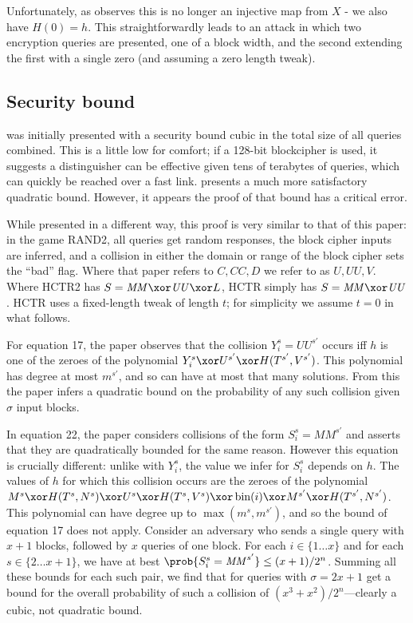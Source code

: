 \documentclass[letterpaper,11pt]{article}
\newcommand*{\MM}{\mathit{MM}}
\newcommand*{\UU}{\mathit{UU}}
\DeclareMathOperator{\fromint}{bin}
\begin{document}
Unfortunately, as \cite{kumarhctr} observes this is no longer
an injective map from \(X\) - we also have \(H(0) = h\). This
straightforwardly leads to an attack in which two encryption queries
are presented, one of a block width, and the second extending
the first with a single zero (and assuming a zero length tweak).

\subsection{Security bound}
\cite{hctr} was initially presented with a security bound cubic
in the total size of all queries combined.  This is a little low
for comfort; if a 128-bit blockcipher is used, it suggests a
distinguisher can be effective given tens of terabytes of queries,
which can quickly be reached over a fast link. 
\cite{hctrquad} presents a much more satisfactory quadratic bound.
However, it appears the proof of that bound has a critical error.

While presented in a different way, this proof is very similar
to that of this paper: in the game RAND2, all queries get random
responses, the block cipher inputs are inferred, and a collision
in either the domain or range of the block cipher
sets the ``bad'' flag. Where that paper refers to 
\(C, \mathit{CC}, D\)
we refer to as \(U, \UU, V\). Where HCTR2 has
\(S = \MM \xor \UU \xor L\), HCTR simply has
\(S = \MM \xor \UU\). HCTR uses a fixed-length tweak
of length \(t\); for simplicity we assume \(t = 0\)
in what follows.

For equation 17, the paper observes that the collision
\(Y_i^s = \UU^{s'}\) occurs iff \(h\) is one of the zeroes
of the polynomial \(Y_i^s \xor U^{s'} \xor H(T^{s'}, V^{s'})\).
This polynomial has degree at most
\(m^{s'}\), and so can have
at most that many solutions. From this the paper infers
a quadratic bound on the probability of any such collision
given \(\sigma\) input blocks.

In equation 22, the paper considers collisions of the form 
\(S_i^s = \MM^{s'}\) and asserts that they are
quadratically bounded for the same reason. However this equation
is crucially different: unlike with \(Y_i^s\), the value we
infer for \(S_i^s\) depends on \(h\). The values of \(h\)
for which this collision occurs are
the zeroes of the polynomial
\(M^s \xor H(T^s, N^s)
\xor U^s \xor H(T^s, V^s) \xor \fromint(i) 
\xor M^{s'} \xor H(T^{s'}, N^{s'})\).
This polynomial can have degree up to 
\(\max(m^s, m^{s'})\), and so the bound of
equation 17 does not apply.
Consider an adversary who
sends a single query with \(x+1\) blocks, followed by
\(x\) queries of one block. For each \(i \in \{1\ldots x\}\) and
for each \(s \in \{2 \ldots x + 1\}\), we have at best
\(\prob{S_i^s = \MM^{s'}} \leq (x + 1)/2^n\). Summing
all these bounds for each such pair, we find that
for queries with \(\sigma = 2x + 1\)
get a bound for the overall probability of such a collision of 
\((x^3 + x^2)/2^n\)---clearly a cubic, not quadratic bound.
\end{document}
